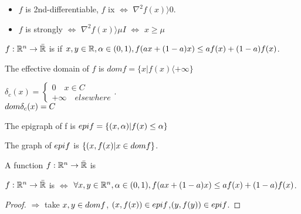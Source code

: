\begin{remark}
\begin{itemize}
\item $f$ is 2nd-differentiable, $f$ ix \cvx $\iff$ $\nabla^2f(x) \rangle  0$.
\item $f$ is strongly \cvx $\iff$ $\nabla^2f(x) \rangle  \mu I$ $\iff$ $x \ge \mu$
\end{itemize}
\end{remark}
\begin{definition}[2]
$f : \mathbb{R}^n \to \bar{\mathbb{R}} $ is \cvx  if $x, y  \in \mathbb{R} , \alpha \in (0,1), f(ax + (1-a)x) \le af(x) + (1-a)f(x)$.  
\end{definition}
The effective domain of $f$ is $dom f = \{x | f(x) \langle + \infty \}$ 
\begin{example}
$\delta_c(x) = \begin{cases}
0 \quad  x \in C \\
+ \infty \quad elsewhere
\end{cases}$.\\
$dom \space \delta_c(x) = C$
\end{example}
\begin{definition}[Epigraph]
The epigraph of f is $epi \space f = \{(x,\alpha) | f(x) \le \alpha\}$
\end{definition}
The graph of $epi \space f$ is $\{ (x,f(x) | x \in dom \space f\}$.
\begin{definition}[III]
A function $f : \mathbb{R}^n \to \bar{\mathbb{R}}$ is %
\end{definition}
\begin{theorem}
$f : \mathbb{R}^n \to \bar{\mathbb{R}}$ is \cvx  $\iff$ $\forall x,y \in \mathbb{R}^n, \alpha \in (0,1), f(ax + (1-a)x) \le af(x) + (1-a)f(x)$.
\end{theorem}
\begin{proof}
$\Rightarrow$ take $x,y \in dom \space f$, $(x,f(x)) \in epi \space f$,$(y,f(y)) \in epi \space f$.
\end{proof}

